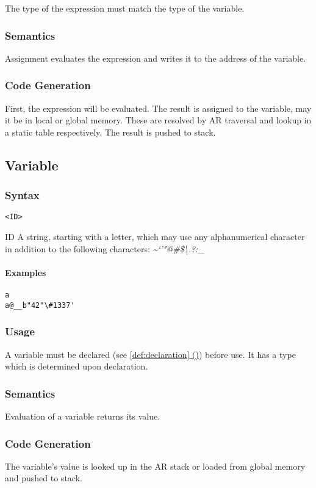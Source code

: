 \documentclass[twoside]{report}
\newcommand*{\fullref}[1]{\hyperref[{#1}]{\ref*{#1} (\nameref*{#1})}}
\newenvironment{mycompactdesc}{\begin{adjustwidth}{0.53cm}{}\begin{compactdesc}}{\end{compactdesc}\end{adjustwidth}}
\begin{document}
The type of the expression must match the type of the variable.
\subsubsection*{Semantics}
Assignment evaluates the expression and writes it to the address of the variable.
\subsubsection*{Code Generation}
First, the expression will be evaluated. The result is assigned to the variable, may it be in local or global memory. These are resolved by AR traversal and lookup in a static table respectively. The result is pushed to stack.


\subsection{Variable}
\label{def:variable}
\subsubsection*{Syntax}
\texttt{<ID>}
\begin{mycompactdesc}
	\item[ID] A string, starting with a letter, which may use any alphanumerical character in addition to the following characters: \emph{\~{}`'"@\#\$\textbackslash.?:\_{}}
\end{mycompactdesc}
\paragraph{Examples}
\begin{verbatim}
a
a@__b"42"\#1337'
\end{verbatim}
\subsubsection*{Usage}
A variable must be declared (see \fullref{def:declaration}) before use. It has a type which is determined upon declaration.
\subsubsection*{Semantics}
Evaluation of a variable returns its value.
\subsubsection*{Code Generation}
The variable's value is looked up in the AR stack or loaded from global memory and pushed to stack.
\end{document}
